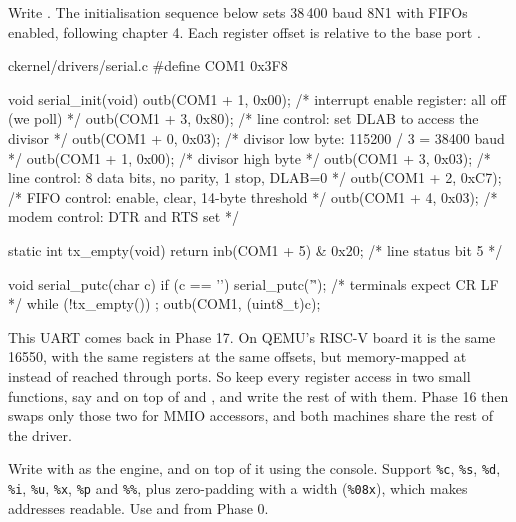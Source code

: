 \documentclass[11pt,a4paper]{article}
\begin{document}
Write . The initialisation sequence below sets 38\,400 baud 8N1 with FIFOs enabled,
following \LOB chapter 4. Each register offset is relative to the base port .

\begin{lst}{c}{kernel/drivers/serial.c}
#define COM1 0x3F8

void serial_init(void)
{
    outb(COM1 + 1, 0x00);   /* interrupt enable register: all off (we poll)        */
    outb(COM1 + 3, 0x80);   /* line control: set DLAB to access the divisor         */
    outb(COM1 + 0, 0x03);   /* divisor low byte:  115200 / 3 = 38400 baud           */
    outb(COM1 + 1, 0x00);   /* divisor high byte                                     */
    outb(COM1 + 3, 0x03);   /* line control: 8 data bits, no parity, 1 stop, DLAB=0 */
    outb(COM1 + 2, 0xC7);   /* FIFO control: enable, clear, 14-byte threshold       */
    outb(COM1 + 4, 0x03);   /* modem control: DTR and RTS set                        */
}

static int tx_empty(void) { return inb(COM1 + 5) & 0x20; }  /* line status bit 5 */

void serial_putc(char c)
{
    if (c == '\n')
        serial_putc('\r');  /* terminals expect CR LF */
    while (!tx_empty())
        ;
    outb(COM1, (uint8_t)c);
}
\end{lst}

\begin{tipbox}
This UART comes back in Phase 17. On QEMU's RISC-V  board it is the same 16550, with the same registers at
the same offsets, but memory-mapped at  instead of reached through ports. So keep every register
access in two small functions, say  and  on top of  and
, and write the rest of  with them. Phase 16 then swaps only those two for MMIO accessors,
and both machines share the rest of the driver.
\end{tipbox}

Write  with  as the engine, and
 on top of it using the console. Support \texttt{\%c}, \texttt{\%s}, \texttt{\%d}, \texttt{\%i}, \texttt{\%u},
\texttt{\%x}, \texttt{\%p} and \texttt{\%\%}, plus zero-padding with a width (\texttt{\%08x}), which makes addresses readable. Use
 and  from Phase 0.
\end{document}
